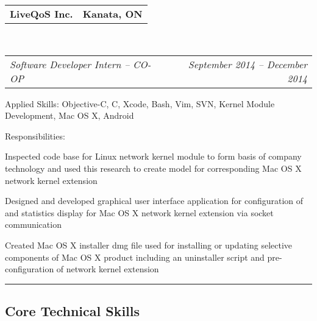 \documentclass[10pt,letterpaper]{article}
\makeatletter
\newenvironment{indentsection}[1]%
{\begin{list}{}%
  {\setlength{\leftmargin}{#1}}%
  \item[]%
}
{\end{list}}
\newcommand{\headerrow}[2]
{\begin{tabular*}{\linewidth}{l@{\extracolsep{\fill}}r}
  #1 &
  #2 \\
\end{tabular*}}
\makeatother
\begin{document}
\begin{itemize}
  \item
  \headerrow
    {\textbf{LiveQoS Inc.}}
    {\textbf{Kanata, ON}}
  \\
  \headerrow
    {\emph{Software Developer Intern -- CO-OP}}
    {\emph{September 2014 -- December 2014}}
  \begin{indentsection}{1em}
    \begin{description*}
      \item[Applied Skills:]
      Objective-C, C, Xcode, Bash, Vim, SVN, Kernel Module Development, Mac OS X,
      Android
      \item[Responsibilities:]
      \hfill
      \begin{itemize*}
        \item Inspected code base for Linux network kernel module to form basis of
        company technology and used this research to create model for
        corresponding Mac OS X network kernel extension
        \item Designed and developed graphical user interface application for
        configuration of and statistics display for Mac OS X network kernel
        extension via socket communication
        \item Created Mac OS X installer dmg file used for installing or updating
        selective components of Mac OS X product including an uninstaller script
        and pre-configuration of network kernel extension
      \end{itemize*}
    \end{description*}
  \end{indentsection}

\end{itemize}

\hrule
\vspace{-0.4em}
\subsection*{Core Technical Skills}
\end{document}
